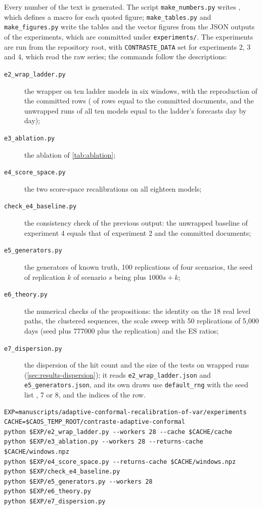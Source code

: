 Every number of the text is generated. The script \texttt{make\_numbers.py} writes , which defines a macro for each quoted figure; \texttt{make\_tables.py} and \texttt{make\_figures.py} write the tables and the vector figures from the JSON outputs of the experiments, which are committed under \texttt{experiments/}. The experiments are run from the repository root, with \texttt{CONTRASTE\_DATA} set for experiments 2, 3 and 4, which read the raw series; the commands follow the descriptions:
\begin{description}
\item[\texttt{e2\_wrap\_ladder.py}] the wrapper on ten ladder models in six windows, with the reproduction of the committed rows (\reproEqual{} of \reproChecked{} rows equal to the committed documents, and the unwrapped runs of all ten models equal to the ladder's forecasts day by day);
\item[\texttt{e3\_ablation.py}] the ablation of \cref{tab:ablation};
\item[\texttt{e4\_score\_space.py}] the two score-space recalibrations on all eighteen models;
\item[\texttt{check\_e4\_baseline.py}] the consistency check of the previous output: the unwrapped baseline of experiment 4 equals that of experiment 2 and the committed documents;
\item[\texttt{e5\_generators.py}] the generators of known truth, 100 replications of four scenarios, the seed of replication $k$ of scenario $s$ being \seedBase{} plus $1000s + k$;
\item[\texttt{e6\_theory.py}] the numerical checks of the propositions: the identity on the 18 real level paths, the clustered sequences, the scale sweep with 50 replications of 5,000 days (seed \seedBase{} plus 777000 plus the replication) and the ES ratios;
\item[\texttt{e7\_dispersion.py}] the dispersion of the hit count and the size of the tests on wrapped runs (\cref{sec:results-dispersion}); it reads \texttt{e2\_wrap\_ladder.json} and \texttt{e5\_generators.json}, and its own draws use \texttt{default\_rng} with the seed list \seedBase{}, 7 or 8, and the indices of the row.
\end{description}
\begingroup\footnotesize
\begin{minipage}{\linewidth}
\begin{verbatim}
EXP=manuscripts/adaptive-conformal-recalibration-of-var/experiments
CACHE=$CAOS_TEMP_ROOT/contraste-adaptive-conformal
python $EXP/e2_wrap_ladder.py --workers 28 --cache $CACHE/cache
python $EXP/e3_ablation.py --workers 28 --returns-cache $CACHE/windows.npz
python $EXP/e4_score_space.py --returns-cache $CACHE/windows.npz
python $EXP/check_e4_baseline.py
python $EXP/e5_generators.py --workers 28
python $EXP/e6_theory.py
python $EXP/e7_dispersion.py
\end{verbatim}
\end{minipage}\par\medskip
